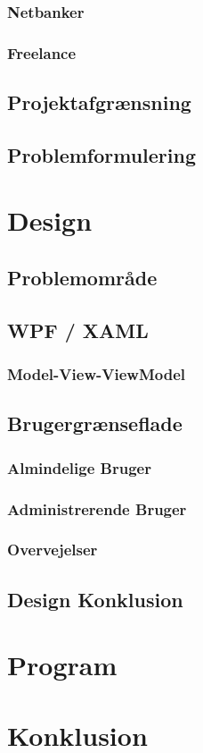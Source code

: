 \subsection{Netbanker}

\subsection{Freelance}


\section{Projektafgrænsning}


\section{Problemformulering}


\chapter{Design}


\section{Problemområde}


\section{WPF / XAML}

\subsection{Model-View-ViewModel}


\section{Brugergrænseflade}
%
\subsection{Almindelige Bruger}
%
\subsection{Administrerende Bruger}
%
\subsection{Overvejelser}
%

\section{Design Konklusion}
%

\chapter{Program}


\chapter{Konklusion}





